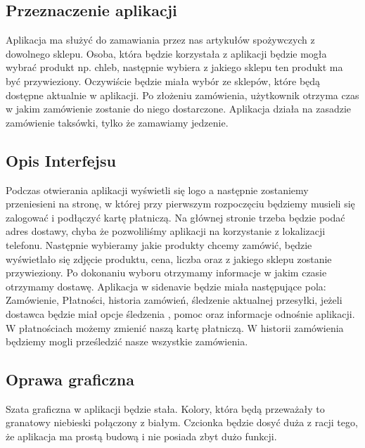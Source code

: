 \subsection{Przeznaczenie aplikacji}
Aplikacja ma służyć do zamawiania przez nas artykułów spożywczych z dowolnego sklepu. Osoba,
która będzie korzystała z aplikacji będzie mogła wybrać produkt np. chleb, następnie wybiera z jakiego
sklepu ten produkt ma być przywieziony. Oczywiście będzie miała wybór ze sklepów, które będą
dostępne aktualnie w aplikacji. Po złożeniu zamówienia, użytkownik otrzyma czas w jakim zamówienie
zostanie do niego dostarczone. Aplikacja działa na zasadzie zamówienie taksówki, tylko że zamawiamy
jedzenie.

\subsection{Opis Interfejsu}
Podczas otwierania aplikacji wyświetli się logo a następnie zostaniemy przeniesieni na stronę, w której
przy pierwszym rozpoczęciu będziemy musieli się zalogować i podłączyć kartę płatniczą. Na głównej
stronie trzeba będzie podać adres dostawy, chyba że pozwoliliśmy aplikacji na korzystanie z lokalizacji
telefonu. Następnie wybieramy jakie produkty chcemy zamówić, będzie wyświetlało się zdjęcie
produktu, cena, liczba oraz z jakiego sklepu zostanie przywieziony. Po dokonaniu wyboru otrzymamy
informacje w jakim czasie otrzymamy dostawę. Aplikacja w sidenavie będzie miała następujące pola:
Zamówienie, Płatności, historia zamówień, śledzenie aktualnej przesyłki, jeżeli dostawca będzie miał
opcje śledzenia , pomoc oraz informacje odnośnie aplikacji. W płatnościach możemy zmienić naszą
kartę płatniczą. W historii zamówienia będziemy mogli prześledzić nasze wszystkie zamówienia.

\subsection{Oprawa graficzna}
Szata graficzna w aplikacji będzie stała. Kolory, która będą przeważały to granatowy niebieski
połączony z białym. Czcionka będzie dosyć duża z racji tego, że aplikacja ma prostą budową i nie
posiada zbyt dużo funkcji.
